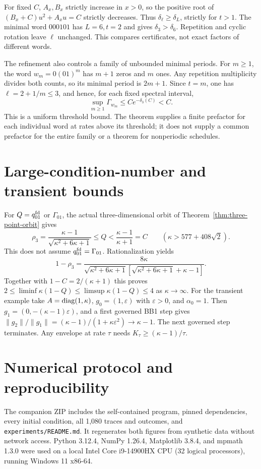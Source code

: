 For fixed $C$, $A_x,B_x$ strictly increase in $x>0$, so the positive root of $(B_x+C)u^2+A_xu=C$ strictly decreases. Thus $\delta_\ell\ge\delta_L$, strictly for $t>1$. The minimal word $000101$ has $L=6,t=2$ and gives $\delta_3>\delta_6$. Repetition and cyclic rotation leave $\ell$ unchanged. This compares certificates, not exact factors of different words.

The refinement also controls a family of unbounded minimal periods. For $m\ge1$, the word $w_m=0(01)^m$ has $m+1$ zeros and $m$ ones. Any repetition multiplicity divides both counts, so its minimal period is $2m+1$. Since $t=m$, one has $\ell=2+1/m\le3$, and hence, for each fixed spectral interval,
\[
 \sup_{m\ge1}\Gamma_{w_m}\le C e^{-\delta_3(C)}<C.
\]
This is a uniform threshold bound. The theorem supplies a finite prefactor for each individual word at rates above its threshold; it does not supply a common prefactor for the entire family or a theorem for nonperiodic schedules.

\section{Large-condition-number and transient bounds}\label{sec:significance}
For $Q=q^{\rm fd}_{01}$ or $\Gamma_{01}$, the actual three-dimensional orbit of Theorem~\ref{thm:three-point-orbit} gives
\[
 \rho_3=\frac{\kappa-1}{\sqrt{\kappa^2+6\kappa+1}}\le Q<
 \frac{\kappa-1}{\kappa+1}=C\qquad(\kappa>577+408\sqrt2).
\]
This does not assume $q^{\rm fd}_{01}=\Gamma_{01}$. Rationalization yields
\[
 1-\rho_3=\frac{8\kappa}{\sqrt{\kappa^2+6\kappa+1}
 [\sqrt{\kappa^2+6\kappa+1}+\kappa-1]}.
\]
Together with $1-C=2/(\kappa+1)$ this proves
$2\le\liminf\kappa(1-Q)\le\limsup\kappa(1-Q)\le4$ as $\kappa\to\infty$.
For the transient example take $A=\operatorname{diag}(1,\kappa)$, $g_0=(1,\varepsilon)$ with $\varepsilon>0$, and $\alpha_0=1$. Then $g_1=(0,-(\kappa-1)\varepsilon)$, and a first governed BB1 step gives
$\|g_2\|/\|g_1\|=(\kappa-1)/(1+\kappa\varepsilon^2)\to\kappa-1$.
The next governed step terminates. Any envelope at rate $\tau$ needs $K_\tau\ge(\kappa-1)/\tau$.

\section{Numerical protocol and reproducibility}\label{sec:numerical-protocol}
The companion ZIP includes the self-contained program, pinned dependencies, every initial condition, all 1,080 traces and outcomes, and \texttt{experiments/README.md}. It regenerates both figures from synthetic data without network access. Python 3.12.4, NumPy 1.26.4, Matplotlib 3.8.4, and mpmath 1.3.0 were used on a local Intel Core i9-14900HX CPU (32 logical processors), running Windows 11 x86-64.

